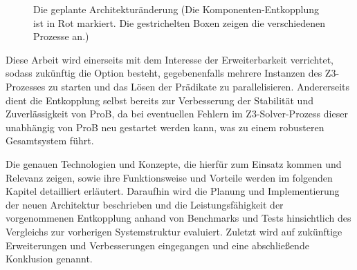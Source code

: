 \begin{figure}[!htp]
    \caption{Die geplante Architekturänderung (Die Komponenten-Entkopplung ist in Rot markiert. Die gestrichelten Boxen zeigen die verschiedenen Prozesse an.)}
    \label{fig:architecture}
\end{figure}
\FloatBarrier

Diese Arbeit wird einerseits mit dem Interesse der Erweiterbarkeit verrichtet, sodass zukünftig die Option besteht,
gegebenenfalls mehrere Instanzen des Z3-Prozesses zu starten und das Lösen der Prädikate zu parallelisieren.
Andererseits dient die Entkopplung selbst bereits zur Verbesserung der Stabilität und Zuverlässigkeit von ProB,
da bei eventuellen Fehlern im Z3-Solver-Prozess dieser unabhängig von ProB neu gestartet werden kann,
was zu einem robusteren Gesamtsystem führt.

Die genauen Technologien und Konzepte, die hierfür zum Einsatz kommen und Relevanz zeigen,
sowie ihre Funktionsweise und Vorteile werden im folgenden Kapitel detailliert erläutert.
Daraufhin wird die Planung und Implementierung der neuen Architektur beschrieben
und die Leistungsfähigkeit der vorgenommenen Entkopplung anhand von Benchmarks und Tests hinsichtlich des Vergleichs zur vorherigen Systemstruktur evaluiert.
Zuletzt wird auf zukünftige Erweiterungen und Verbesserungen eingegangen
und eine abschließende Konklusion genannt.
